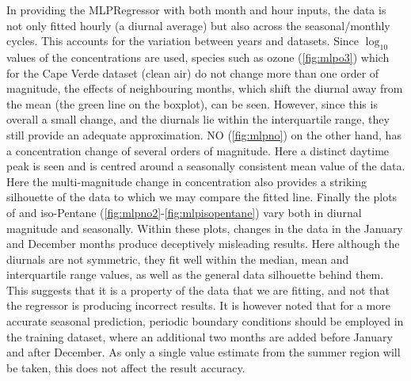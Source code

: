 In providing the MLPRegressor with both month and hour inputs, the data is not only fitted hourly (a diurnal average) but also across the seasonal/monthly cycles. This accounts for the variation between years and datasets. Since $\log_{10}$ values of the concentrations are used, species such as ozone (\autoref{fig:mlpo3}) which for the Cape Verde dataset (clean air) do not change more than one order of magnitude, the effects of neighbouring months, which shift the diurnal away from the mean (the green line on the boxplot), can be seen. However, since this is overall a small change, and the diurnals lie within the interquartile range, they still provide an adequate approximation. NO (\autoref{fig:mlpno}) on the other hand, has a concentration change of several orders of magnitude. Here a distinct daytime peak is seen and is centred around a seasonally consistent mean value of the data. Here the multi-magnitude change in concentration also provides a striking silhouette of the data to which we may compare the fitted line.
Finally the plots of  and iso-Pentane (\autoref{fig:mlpno2}-\ref{fig:mlpisopentane}) vary both in diurnal magnitude and seasonally. Within these plots, changes in the data in the January and December months produce deceptively misleading results. Here although the diurnals are not symmetric, they fit well within the median, mean and interquartile range values, as well as the general data silhouette behind them. This suggests that it is a property of the data that we are fitting, and not that the regressor is producing incorrect results. It is however noted that for a more accurate seasonal prediction, periodic boundary conditions should be employed in the training dataset, where an additional two months are added before January and after December. As only a single value estimate from the summer region will be taken, this does not affect the result accuracy.

